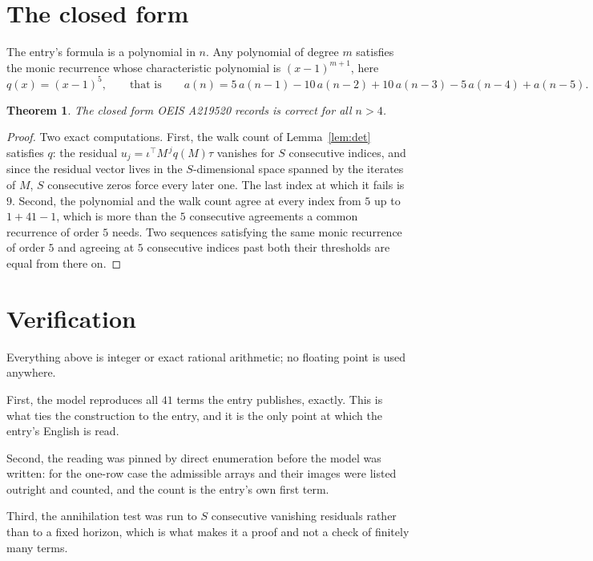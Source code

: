 \documentclass[11pt,a4paper]{article}
\theoremstyle{plain}
\newtheorem{theorem}{Theorem}
\theoremstyle{definition}
\begin{document}
\section{The closed form}

The entry's formula is a polynomial in $n$. Any polynomial of degree $m$ satisfies the monic
recurrence whose characteristic polynomial is $(x-1)^{m+1}$, here
\[
q(x)=(x-1)^{5},\qquad\text{that is}\qquad a(n)=5\,a(n-1) - 10\,a(n-2) + 10\,a(n-3) - 5\,a(n-4) + a(n-5).
\]

\begin{theorem}
The closed form OEIS A219520 records is correct for all $n>4$.
\end{theorem}

\begin{proof}
Two exact computations. First, the walk count of Lemma~\ref{lem:det} satisfies $q$: the
residual $u_j=\iota^{\!\top}M^{\,j}q(M)\tau$ vanishes for $S$ consecutive indices, and
since the residual vector lives in the $S$-dimensional space spanned by the iterates of $M$,
$S$ consecutive zeros force every later one. The last index at which it fails is $9$.
Second, the polynomial and the walk count agree at every index from $5$ up to
$1 + 41 - 1$, which is more than the $5$ consecutive agreements a
common recurrence of order $5$ needs. Two sequences satisfying the same monic recurrence
of order $5$ and agreeing at $5$ consecutive indices past both their thresholds are
equal from there on.
\end{proof}

\section{Verification}

Everything above is integer or exact rational arithmetic; no floating point is used anywhere.

First, the model reproduces all $41$ terms the entry publishes, exactly. This is what
ties the construction to the entry, and it is the only point at which the entry's English is
read.

Second, the reading was pinned by direct enumeration before the model was written: for the
one-row case the admissible arrays and their images were listed outright and counted, and the
count is the entry's own first term.

Third, the annihilation test was run to $S$ consecutive vanishing residuals rather than to a
fixed horizon, which is what makes it a proof and not a check of finitely many terms.
\end{document}
